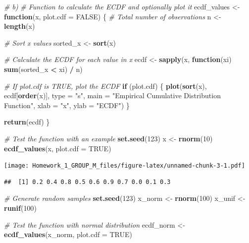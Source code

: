\documentclass[
]{article}
\newenvironment{Shaded}{\begin{snugshade}}{\end{snugshade}}
\newcommand{\AttributeTok}[1]{\textcolor[rgb]{0.13,0.29,0.53}{#1}}
\newcommand{\CommentTok}[1]{\textcolor[rgb]{0.56,0.35,0.01}{\textit{#1}}}
\newcommand{\ConstantTok}[1]{\textcolor[rgb]{0.56,0.35,0.01}{#1}}
\newcommand{\ControlFlowTok}[1]{\textcolor[rgb]{0.13,0.29,0.53}{\textbf{#1}}}
\newcommand{\DecValTok}[1]{\textcolor[rgb]{0.00,0.00,0.81}{#1}}
\newcommand{\FunctionTok}[1]{\textcolor[rgb]{0.13,0.29,0.53}{\textbf{#1}}}
\newcommand{\NormalTok}[1]{#1}
\newcommand{\OtherTok}[1]{\textcolor[rgb]{0.56,0.35,0.01}{#1}}
\newcommand{\SpecialCharTok}[1]{\textcolor[rgb]{0.81,0.36,0.00}{\textbf{#1}}}
\newcommand{\StringTok}[1]{\textcolor[rgb]{0.31,0.60,0.02}{#1}}
\begin{document}
\begin{Shaded}
\begin{Highlighting}[]
\CommentTok{\# b)}
\CommentTok{\# Function to calculate the ECDF and optionally plot it}
\NormalTok{ecdf\_values }\OtherTok{\textless{}{-}} \ControlFlowTok{function}\NormalTok{(x, }\AttributeTok{plot.cdf =} \ConstantTok{FALSE}\NormalTok{) \{}
  \CommentTok{\# Total number of observations}
\NormalTok{  n }\OtherTok{\textless{}{-}} \FunctionTok{length}\NormalTok{(x)}
  
  \CommentTok{\# Sort x values}
\NormalTok{  sorted\_x }\OtherTok{\textless{}{-}} \FunctionTok{sort}\NormalTok{(x)}
  
  \CommentTok{\# Calculate the ECDF for each value in x}
\NormalTok{  ecdf }\OtherTok{\textless{}{-}} \FunctionTok{sapply}\NormalTok{(x, }\ControlFlowTok{function}\NormalTok{(xi) }\FunctionTok{sum}\NormalTok{(sorted\_x }\SpecialCharTok{\textless{}}\NormalTok{ xi) }\SpecialCharTok{/}\NormalTok{ n)}
  
  \CommentTok{\# If plot.cdf is TRUE, plot the ECDF}
  \ControlFlowTok{if}\NormalTok{ (plot.cdf) \{}
    \FunctionTok{plot}\NormalTok{(}\FunctionTok{sort}\NormalTok{(x), ecdf[}\FunctionTok{order}\NormalTok{(x)], }\AttributeTok{type =} \StringTok{"s"}\NormalTok{, }\AttributeTok{main =} \StringTok{"Empirical Cumulative Distribution Function"}\NormalTok{,}
         \AttributeTok{xlab =} \StringTok{"x"}\NormalTok{, }\AttributeTok{ylab =} \StringTok{"ECDF"}\NormalTok{)}
\NormalTok{  \}}
  
  \FunctionTok{return}\NormalTok{(ecdf)}
\NormalTok{\}}

\CommentTok{\# Test the function with an example}
\FunctionTok{set.seed}\NormalTok{(}\DecValTok{123}\NormalTok{)}
\NormalTok{x }\OtherTok{\textless{}{-}} \FunctionTok{rnorm}\NormalTok{(}\DecValTok{10}\NormalTok{)}
\FunctionTok{ecdf\_values}\NormalTok{(x, }\AttributeTok{plot.cdf =} \ConstantTok{TRUE}\NormalTok{)}
\end{Highlighting}
\end{Shaded}

\texttt{[image: Homework\_1\_GROUP\_M\_files/figure-latex/unnamed-chunk-3-1.pdf]}

\begin{verbatim}
##  [1] 0.2 0.4 0.8 0.5 0.6 0.9 0.7 0.0 0.1 0.3
\end{verbatim}

\begin{Shaded}
\begin{Highlighting}[]
\CommentTok{\# Generate random samples}
\FunctionTok{set.seed}\NormalTok{(}\DecValTok{123}\NormalTok{)}
\NormalTok{x\_norm }\OtherTok{\textless{}{-}} \FunctionTok{rnorm}\NormalTok{(}\DecValTok{100}\NormalTok{)}
\NormalTok{x\_unif }\OtherTok{\textless{}{-}} \FunctionTok{runif}\NormalTok{(}\DecValTok{100}\NormalTok{)}

\CommentTok{\# Test the function with normal distribution}
\NormalTok{ecdf\_norm }\OtherTok{\textless{}{-}} \FunctionTok{ecdf\_values}\NormalTok{(x\_norm, }\AttributeTok{plot.cdf =} \ConstantTok{TRUE}\NormalTok{)}
\end{Highlighting}
\end{Shaded}
\end{document}
